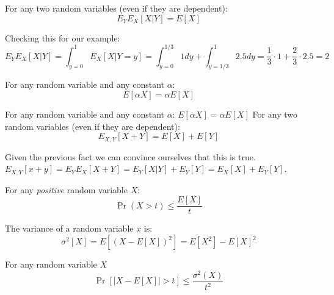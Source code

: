 \documentclass{article}
\begin{document}
\begin{fact}
For any two random variables (even if they are dependent):
\begin{equation}
E_{Y}E_{X}[ X | Y] = E[X]
\end{equation}
\end{fact}
Checking this for our example:
\begin{equation}
E_{Y}E_{X} [ X | Y] = \int_{y=0}^{1} E_{X}[X|Y = y] =
\int_{y=0}^{1/3}1dy + \int_{y=1/3}^{1}2.5dy = \frac{1}{3} \cdot 1 +
\frac{2}{3}\cdot 2.5 = 2
\end{equation}

\begin{fact}%
For any random variable and any constant $\alpha$:
$$E[\alpha X] = \alpha E[X]$$
\end{fact}

\begin{fact}%
For any random variable and any constant $\alpha$:
$E[\alpha X] = \alpha E[X]$
For any two random variables (even if they are dependent):
\begin{equation}
E_{X,Y}[X+Y] = E[X] + E[Y]
\end{equation}
\end{fact}
Given the previous fact we can convince ourselves that this is true.
$E_{X,Y}[x+y] = E_{Y}E_{X}[X+Y] = E_{Y} [X|Y] + E_{Y} [Y] = E_X[X] +
E_Y[Y]$.

\begin{fact}%
For any {\it positive} random variable $X$:
\begin{equation}
\Pr(X > t) \le \frac{E[X]}{t}
\end{equation}
\end{fact}


\begin{definition}
The variance of a random variable $x$ is:
\begin{equation}
\sigma^2[X] = E[(X-E[X])^2] = E[X^2] - E[X]^2
\end{equation}
\end{definition}

\begin{fact}%
For any random variable $X$
\begin{equation}
\Pr[|X-E[X]| > t] \le \frac{\sigma^2(X)}{t^2}
\end{equation}
\end{fact}
\end{document}
